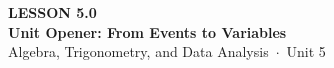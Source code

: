 \documentclass[aspectratio=169, 11pt]{beamer}
\begin{document}
{
\begin{frame}[plain]
  \vspace{2.8cm}\hspace{0.55cm}%
  \begin{minipage}{0.9\textwidth}
    {\color{goldacc}\bfseries\small LESSON 5.0}\\[0.5cm]
    {\color{white}\bfseries\LARGE Unit Opener: From Events to Variables}\\[1.2cm]
    {\color{mistmid}\small Algebra, Trigonometry, and Data Analysis~$\cdot$~Unit 5}
  \end{minipage}
\end{frame}
}

\begin{frame}[t, plain]
\end{frame}
\end{document}
